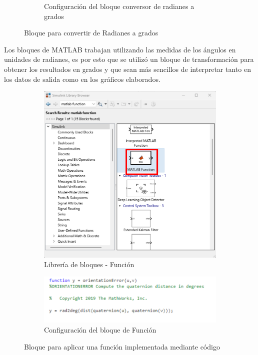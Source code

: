 \begin{figure}[htbp]
\begin{subfigure}[b]{0.45\textwidth}
        \caption{Configuración del bloque conversor de radianes a grados}
        \label{fig:conf_bloques_R2D}
    \end{subfigure}
    \caption{Bloque para convertir de Radianes a grados}
    \label{fig:bloques_R2D}
\end{figure}

Los bloques de MATLAB trabajan utilizando las medidas de los ángulos en unidades de radianes, es por esto que se utilizó un bloque de transformación para  obtener los resultados en grados y que sean más sencillos de interpretar tanto en los datos de salida como en los gráficos elaborados.

\newpage

\begin{figure}[htbp]
    \centering
    \begin{subfigure}[b]{0.35\textwidth}
        \centering
        \includegraphics[width=\textwidth]{fig/Capitulo5/Caso_de_estudio_IMU/Generador_de_salidas/libreria_bloque_de_funcion.pdf}
        \caption{Librería de bloques - Función}
        \label{fig:lib_bloques_func}
    \end{subfigure}
    \hfill
    \begin{subfigure}[b]{0.45\textwidth}
        \centering
        \includegraphics[width=\textwidth]{fig/Capitulo5/Caso_de_estudio_IMU/Generador_de_salidas/configuracion_codigo.pdf}
        \caption{Configuración del bloque de Función}
        \label{fig:config_bloques_func}
    \end{subfigure}
    \caption{Bloque para aplicar una función implementada mediante código}
    \label{fig:bloques_func}
\end{figure}

